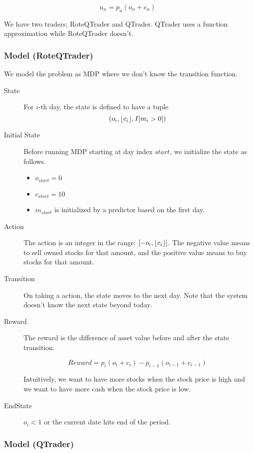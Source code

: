 \documentclass[twocolumn,10pt]{asme2ej}
\DeclarePairedDelimiter\floor{\lfloor}{\rfloor}
\begin{document}
\[
u_n = p_n(o_n + c_n)
\]

We have two traders; RoteQTrader and QTrader. QTrader uses a function approximation while RoteQTrader doesn't.

\subsubsection{Model (RoteQTrader)}

We model the problem as MDP where we don't know the transition function.

\begin{description}
\item[State] For $i$-th day, the state is defined to have a tuple
  \[
  (o_i,\floor*{c_i},I[m_i > 0])
  \]
\item[Initial State] Before running MDP starting at day index $start$,
  we initialize the state as follows.
  \begin{itemize}
  \item $o_{start} = 0$
  \item $c_{start} = 10$
  \item $m_{start}$ is initialized by a predictor based on the first day.
  \end{itemize}
  
\item[Action] The action is an integer in the range: $[-o_i,\floor*{c_i}]$. The
  negative value means to sell owned stocks for that amount, and the
  positive value means to buy stocks for that amount.

\item[Transition] On taking a action, the state moves to the next
  day. Note that the system doesn't know the next state beyond today.

\item[Reward] The reward is the difference of asset value before and
  after the state transition. 
  
  \[
  Reward = p_i(o_{i} + c_{i}) - p_{i-1}(o_{i-1} + c_{i-1})
  \]
  
  Intuitively, we want to have more stocks when the stock price is
  high and we want to have more cash when the stock price is low.

\item[EndState] $o_i < 1$ or the current date hits end of the period.
\end{description}

\subsubsection{Model (QTrader)}
\end{document}
